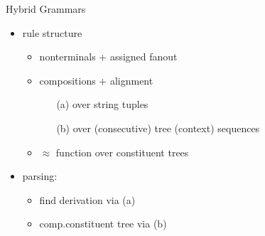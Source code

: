 \documentclass[slides]{subfiles}
\begin{document}
    \begin{frame}{Hybrid Grammars \citep{Ned14}}
        \begin{minipage}{.58\linewidth}
            \begin{overprint}
                    \resizebox{\linewidth}{!}{
                        }
                    \resizebox{\linewidth}{!}{
                        }
            \end{overprint}
        \end{minipage}
        \hfill
        \begin{minipage}{.4\linewidth}
            \begin{itemize}
                \item rule structure
                    \begin{itemize}
                        \item \alert<2>{nonterminals} + \alert<3-6>{assigned fanout}
                        \item \alert<4-12>{compositions} + \alert<11-12>{alignment}
                            \begin{itemize}
                                \item[(a)] \alert<4-8>{over string tuples}
                                \item[(b)] \alert<9-10>{over (consecutive) tree (context) sequences}
                            \end{itemize}
                        \item<13-> \alert<13>{\(\approx\) function over constituent trees}
                    \end{itemize}
                \item<21-> parsing:
                \begin{itemize}
                    \item find derivation via (a)
                    \item comp.\@ constituent tree via (b)
                \end{itemize}
            \end{itemize}
        \end{minipage}
    \end{frame}
\end{document}
